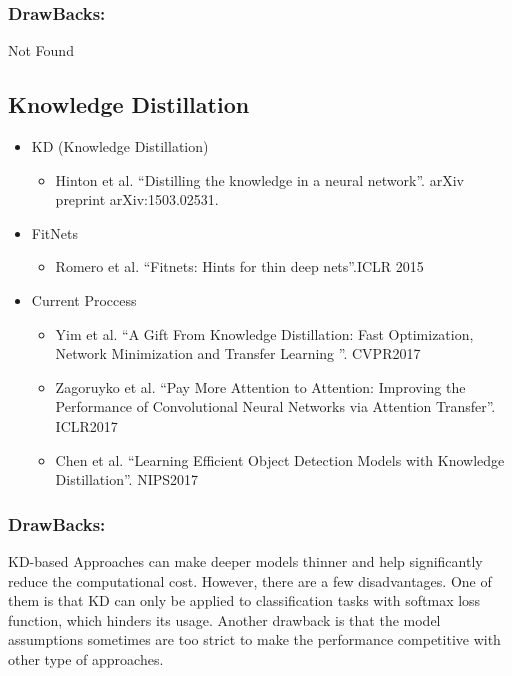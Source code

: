 \documentclass[a4paper]{article}
\begin{document}
			\subsubsection{DrawBacks:}
				Not Found		
		\subsection{Knowledge Distillation}
			\begin{itemize}
				\item KD (Knowledge Distillation)
					\begin{itemize}
						\item Hinton et al. “Distilling the knowledge in a neural network”. arXiv preprint arXiv:1503.02531.
					\end{itemize}
				\item FitNets
					\begin{itemize}
						\item Romero et al. “Fitnets: Hints for thin deep nets”.ICLR 2015
					\end{itemize}
				\item Current Proccess
					\begin{itemize}
						\item Yim et al. “A Gift From Knowledge Distillation: Fast Optimization, Network
						Minimization and Transfer Learning ”. CVPR2017
						\item Zagoruyko et al. “Pay More Attention to Attention: Improving the Performance of
						Convolutional Neural Networks via Attention Transfer”. ICLR2017
						\item Chen et al. “Learning Efficient Object Detection Models with Knowledge Distillation”.
						NIPS2017
					\end{itemize}
			\end{itemize}						
			\subsubsection{DrawBacks:}
						KD-based Approaches can make deeper models
			thinner and help significantly reduce the computational
			cost. However, there are a few disadvantages. One of them is
			that KD can only be applied to classification tasks with softmax
			loss function, which hinders its usage. Another drawback
			is that the model assumptions sometimes are too strict to make
			the performance competitive with other type of approaches.
\end{document}
